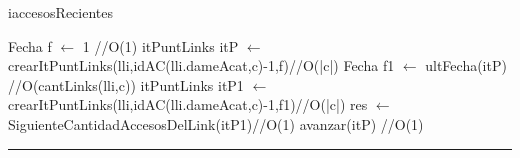 \begin{algorithm}[H]
\caption{iaccesosRecientes}
\begin{algorithmic}[1]
\state Fecha f $\gets$ 1 \hfill//O(1)
\state itPuntLinks itP $\gets$ crearItPuntLinks(lli,idAC(lli.dameAcat,c)-1,f)\hfill//O(|c|)
\state Fecha f1 $\gets$ ultFecha(itP) \hfill //O(cantLinks(lli,c))
\state itPuntLinks itP1 $\gets$ crearItPuntLinks(lli,idAC(lli.dameAcat,c)-1,f1)\hfill//O(|c|)
\state res $\gets$ SiguienteCantidadAccesosDelLink(itP1)\hfill//O(1)
\endif
\state avanzar(itP) \hfill//O(1)
\endwhile
\EndFunction 
\end{algorithmic}
\hrule
{}
\end{algorithm}